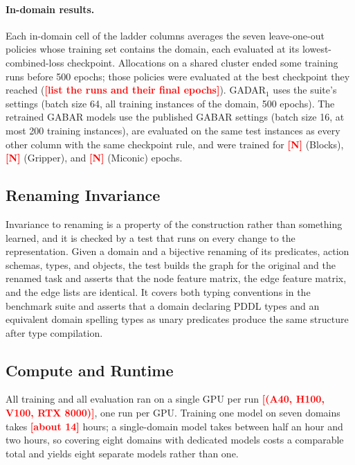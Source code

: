 \documentclass[letterpaper]{article}
\newcommand{\gadar}{GADAR}
\newcommand{\todonum}[1]{\textcolor{red}{\textbf{[#1]}}}
\begin{document}
\paragraph{In-domain results.} Each in-domain cell of the ladder columns
averages the seven leave-one-out policies whose training set contains the
domain, each evaluated at its lowest-combined-loss checkpoint. Allocations
on a shared cluster ended some training runs before 500 epochs; those
policies were evaluated at the best checkpoint they reached
(\todonum{list the runs and their final epochs}). \gadar{}$_1$ uses the
suite's settings (batch size 64, all training instances of the domain,
500 epochs). The retrained GABAR models use the published GABAR settings
(batch size 16, at most 200 training instances), are evaluated on the same
test instances as every other column with the same checkpoint rule, and
were trained for \todonum{N} (Blocks), \todonum{N} (Gripper), and
\todonum{N} (Miconic) epochs.

\subsection{Renaming Invariance}
\label{app:invariance}

Invariance to renaming is a property of the construction rather than
something learned, and it is checked by a test that runs on every change to
the representation. Given a domain and a bijective renaming of its
predicates, action schemas, types, and objects, the test builds the graph for
the original and the renamed task and asserts that the node feature matrix,
the edge feature matrix, and the edge lists are identical. It covers both
typing conventions in the benchmark suite and asserts that a domain declaring
PDDL types and an equivalent domain spelling types as unary predicates
produce the same structure after type compilation.

\subsection{Compute and Runtime}
\label{app:compute}

All training and all evaluation ran on a single GPU per run \todonum{(A40, H100, V100, RTX 8000)}, one
run per GPU. Training one model on seven domains takes \todonum{about 14}
hours; a single-domain model takes between half an hour and two hours, so
covering eight domains with dedicated models costs a comparable total and
yields eight separate models rather than one.
\end{document}
